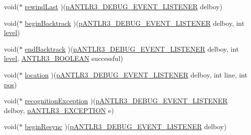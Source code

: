 \begin{DoxyCompactItemize}
\item 
void($\ast$ \hyperlink{struct_a_n_t_l_r3___d_e_b_u_g___e_v_e_n_t___l_i_s_t_e_n_e_r__struct_abc6b46435d5264bdae6ae7a7cb8996a5}{rewind\-Last} )(\hyperlink{antlr3interfaces_8h_ab226a624395fcc0b8fe2b29ae60b6116}{p\-A\-N\-T\-L\-R3\-\_\-\-D\-E\-B\-U\-G\-\_\-\-E\-V\-E\-N\-T\-\_\-\-L\-I\-S\-T\-E\-N\-E\-R} delboy)
\item 
void($\ast$ \hyperlink{struct_a_n_t_l_r3___d_e_b_u_g___e_v_e_n_t___l_i_s_t_e_n_e_r__struct_a77996ab10c5e44e69c749153db018864}{begin\-Backtrack} )(\hyperlink{antlr3interfaces_8h_ab226a624395fcc0b8fe2b29ae60b6116}{p\-A\-N\-T\-L\-R3\-\_\-\-D\-E\-B\-U\-G\-\_\-\-E\-V\-E\-N\-T\-\_\-\-L\-I\-S\-T\-E\-N\-E\-R} delboy, int \hyperlink{_read_d_m3___matlab_8m_afde8e18a788ccc92fc61cab298bca7e3}{level})
\item 
void($\ast$ \hyperlink{struct_a_n_t_l_r3___d_e_b_u_g___e_v_e_n_t___l_i_s_t_e_n_e_r__struct_a651d4b204361bb951131408d817a0955}{end\-Backtrack} )(\hyperlink{antlr3interfaces_8h_ab226a624395fcc0b8fe2b29ae60b6116}{p\-A\-N\-T\-L\-R3\-\_\-\-D\-E\-B\-U\-G\-\_\-\-E\-V\-E\-N\-T\-\_\-\-L\-I\-S\-T\-E\-N\-E\-R} delboy, int \hyperlink{_read_d_m3___matlab_8m_afde8e18a788ccc92fc61cab298bca7e3}{level}, \hyperlink{antlr3defs_8h_a5b33dccbba3b7212539695e21df4079b}{A\-N\-T\-L\-R3\-\_\-\-B\-O\-O\-L\-E\-A\-N} successful)
\item 
void($\ast$ \hyperlink{struct_a_n_t_l_r3___d_e_b_u_g___e_v_e_n_t___l_i_s_t_e_n_e_r__struct_a4fa291bc4f73722b4a1f40a79a9428f9}{location} )(\hyperlink{antlr3interfaces_8h_ab226a624395fcc0b8fe2b29ae60b6116}{p\-A\-N\-T\-L\-R3\-\_\-\-D\-E\-B\-U\-G\-\_\-\-E\-V\-E\-N\-T\-\_\-\-L\-I\-S\-T\-E\-N\-E\-R} delboy, int line, int \hyperlink{_display_model_properties_8m_adf54215d760dbf0f9fe5627a39015333}{pos})
\item 
void($\ast$ \hyperlink{struct_a_n_t_l_r3___d_e_b_u_g___e_v_e_n_t___l_i_s_t_e_n_e_r__struct_a71f7ad3f972749e585973773a7cfb69d}{recognition\-Exception} )(\hyperlink{antlr3interfaces_8h_ab226a624395fcc0b8fe2b29ae60b6116}{p\-A\-N\-T\-L\-R3\-\_\-\-D\-E\-B\-U\-G\-\_\-\-E\-V\-E\-N\-T\-\_\-\-L\-I\-S\-T\-E\-N\-E\-R} delboy, \hyperlink{antlr3interfaces_8h_a71e034bba80bdc564fd0c8d62f2962b5}{p\-A\-N\-T\-L\-R3\-\_\-\-E\-X\-C\-E\-P\-T\-I\-O\-N} e)
\item 
void($\ast$ \hyperlink{struct_a_n_t_l_r3___d_e_b_u_g___e_v_e_n_t___l_i_s_t_e_n_e_r__struct_a0c910c11c19fedc74640fa240ad2bdc4}{begin\-Resync} )(\hyperlink{antlr3interfaces_8h_ab226a624395fcc0b8fe2b29ae60b6116}{p\-A\-N\-T\-L\-R3\-\_\-\-D\-E\-B\-U\-G\-\_\-\-E\-V\-E\-N\-T\-\_\-\-L\-I\-S\-T\-E\-N\-E\-R} delboy)

\end{DoxyCompactItemize}
